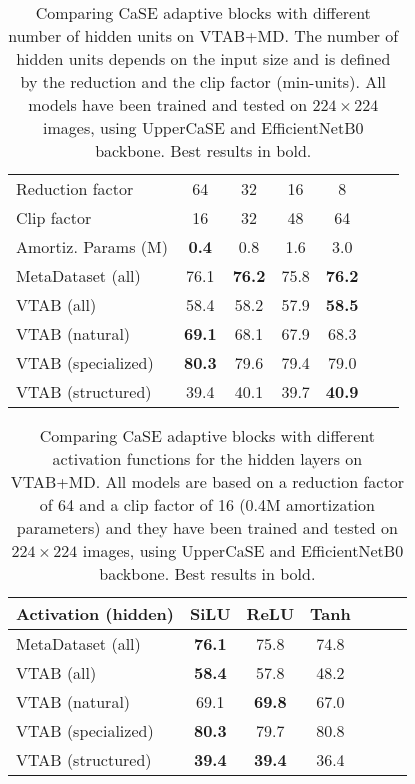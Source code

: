 \documentclass{article}
\begin{document}
\begin{table}[H]
\caption{Comparing CaSE adaptive blocks with different number of hidden units on VTAB+MD. The number of hidden units depends on the input size and is defined by the reduction and the clip factor (min-units). All models have been trained and tested on $224 \times 224$ images, using UpperCaSE and EfficientNetB0 backbone. Best results in bold.}
\vskip 0.15in
\begin{center}
\begin{tabular}{lcccccc}
\toprule
Reduction factor & 64 & 32 & 16 & 8\\
Clip factor & 16 & 32 & 48 & 64\\
Amortiz. Params (M) & \textbf{0.4} & 0.8 & 1.6 & 3.0\\
\midrule
MetaDataset (all) & 76.1 & \textbf{76.2} & 75.8 & \textbf{76.2}\\
VTAB (all) & 58.4 & 58.2 & 57.9 & \textbf{58.5}\\
VTAB (natural) & \textbf{69.1} & 68.1 & 67.9 & 68.3\\
VTAB (specialized) & \textbf{80.3} & 79.6 & 79.4 & 79.0\\
VTAB (structured) & 39.4 & 40.1 & 39.7 & \textbf{40.9}\\
\bottomrule
\end{tabular}
\label{tab:ablation_hidden_units}
\end{center}
\vskip -0.1in
\end{table}

\begin{table}[H]
\caption{Comparing CaSE adaptive blocks with different activation functions for the hidden layers on VTAB+MD. All models are based on a reduction factor of 64 and a clip factor of 16 (0.4M amortization parameters) and they have been trained and tested on $224 \times 224$ images, using UpperCaSE and EfficientNetB0 backbone. Best results in bold.}
\vskip 0.15in
\begin{center}
\begin{tabular}{lcccccc}
\toprule
Activation (hidden) & SiLU & ReLU & Tanh\\
\midrule
MetaDataset (all) & \textbf{76.1} & 75.8 & 74.8\\
VTAB (all) & \textbf{58.4} & 57.8 & 48.2\\
VTAB (natural) & 69.1 & \textbf{69.8} & 67.0\\
VTAB (specialized) & \textbf{80.3} & 79.7 & 80.8\\
VTAB (structured) & \textbf{39.4} & \textbf{39.4} & 36.4\\
\bottomrule
\end{tabular}
\label{tab:ablation_hidden_activation}
\end{center}
\vskip -0.1in
\end{table}
\end{document}
